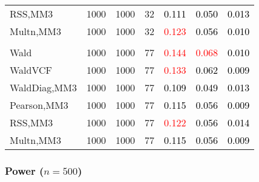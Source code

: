 \documentclass[
]{article}
\begin{document}
\begin{table}[H]
{\begin{tabular}[t]{lrrrrrr}
\hspace{1em}RSS,MM3 & 1000 & 1000 & 32 & \textcolor{black}{0.111} & \textcolor{black}{0.050} & \textcolor{black}{0.013}\\
\hspace{1em}Multn,MM3 & 1000 & 1000 & 32 & \textcolor{red}{0.123} & \textcolor{black}{0.056} & \textcolor{black}{0.010}\\
\addlinespace[0.3em]
\multicolumn{7}{l}{\textbf{3F 15V}}\\
\hspace{1em}Wald & 1000 & 1000 & 77 & \textcolor{red}{0.144} & \textcolor{red}{0.068} & \textcolor{black}{0.010}\\
\hspace{1em}WaldVCF & 1000 & 1000 & 77 & \textcolor{red}{0.133} & \textcolor{black}{0.062} & \textcolor{black}{0.009}\\
\hspace{1em}WaldDiag,MM3 & 1000 & 1000 & 77 & \textcolor{black}{0.109} & \textcolor{black}{0.049} & \textcolor{black}{0.013}\\
\hspace{1em}Pearson,MM3 & 1000 & 1000 & 77 & \textcolor{black}{0.115} & \textcolor{black}{0.056} & \textcolor{black}{0.009}\\
\hspace{1em}RSS,MM3 & 1000 & 1000 & 77 & \textcolor{red}{0.122} & \textcolor{black}{0.056} & \textcolor{black}{0.014}\\
\hspace{1em}Multn,MM3 & 1000 & 1000 & 77 & \textcolor{black}{0.115} & \textcolor{black}{0.056} & \textcolor{black}{0.009}\\
\bottomrule
\end{tabular}}
\endgroup{}
\end{table}

\subsubsection{\texorpdfstring{Power
(\(n=500\))}{Power (n=500)}}\label{power-n500-1}
\end{document}
